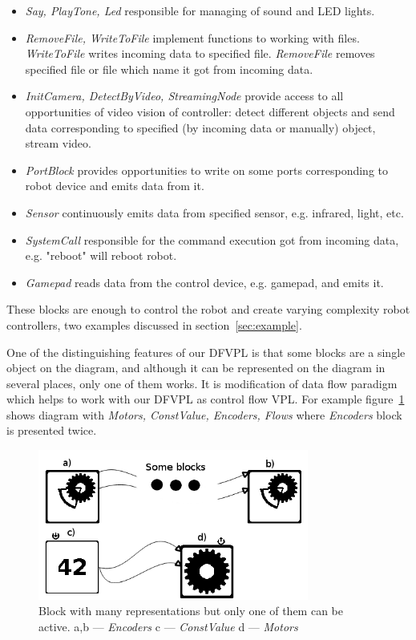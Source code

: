 \documentclass[conference,compsoc]{IEEEtran}
\begin{document}
\begin{itemize}
\begin{itemize}
\item \textit{Say, PlayTone, Led} responsible for managing of sound and LED lights.
\item \textit{RemoveFile, WriteToFile} implement functions to working with files. \textit{WriteToFile} writes incoming data to specified file. \textit{RemoveFile} removes specified file or file which name it got from incoming data.
\item \textit{InitCamera, DetectByVideo, StreamingNode} provide access to all opportunities of video vision of controller: detect different objects and send data corresponding to specified (by incoming data or manually) object, stream video.
\item \textit{PortBlock} provides opportunities to write on some ports corresponding to robot device and emits data from it.
\item \textit{Sensor} continuously emits data from specified sensor, e.g. infrared, light, etc.
\item \textit{SystemCall} responsible for the command execution got from incoming data, e.g. "reboot" will reboot robot.
\item \textit{Gamepad} reads data from the control device, e.g. gamepad, and emits it.
\end{itemize} 
\end{itemize} 


These blocks are enough to control the robot and create varying complexity robot controllers, two examples discussed in section~\ref{sec:example}. 

One of the distinguishing features of our DFVPL is that some blocks are a single object on the diagram, and although it can be represented on the diagram in several places, only one of them works. It is modification of data flow paradigm which helps to work with our DFVPL as control flow VPL. For example figure~\ref{image:encoder} shows diagram with \textit{Motors, ConstValue, Encoders, Flows} where \textit{Encoders} block is presented twice. 

\begin{figure}[ht]
	\centering
	\includegraphics[width=3.5in]{Encoders.png}
	\caption{Block with many representations but only one of them can be active. a,b --- \textit{Encoders} c --- \textit{ConstValue} d --- \textit{Motors}}
	\label{image:encoder}
\end{figure}
\end{document}
